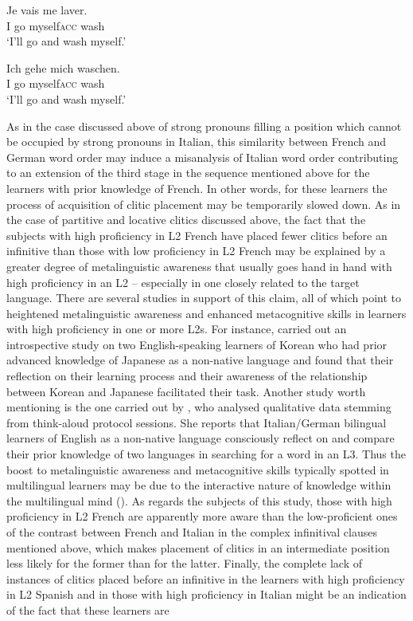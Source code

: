 \documentclass[output=paper,modfonts,nonflat,newtxmath]{langsci/langscibook}
\begin{document}
\ea \label{ex:sciutti:45}
\begin{xlist}
    \ex \label{ex:sciutti:45a}
    \gll Je vais me laver.\\
        I go myself\textsc{acc} wash\\
    \glt  ‘I’ll go and wash myself.’

    \ex \label{ex:sciutti:45b}
    \gll Ich gehe mich waschen.\\
        I go myself\textsc{acc} wash\\
    \glt ‘I’ll go and wash myself.’
\end{xlist}
\z

As in the case discussed above of strong pronouns filling a position which cannot be occupied by strong pronouns in Italian, this similarity between French and German word order may induce a misanalysis of Italian word order contributing to an extension of the third stage in the sequence mentioned above for the learners with prior knowledge of French. In other words, for these learners the process of acquisition of clitic placement may be temporarily slowed down. As in the case of partitive and locative clitics discussed above, the fact that the subjects with high proficiency in L2 French have placed fewer clitics before an infinitive than those with low proficiency in L2 French may be explained by a greater degree of metalinguistic awareness that usually goes hand in hand with high proficiency in an L2 – especially in one closely related to the target language. There are several studies in support of this claim, all of which point to heightened metalinguistic awareness and enhanced metacognitive skills in learners with high proficiency in one or more L2s. For instance, \citet{Fouser2001} carried out an introspective study on two English-speaking learners of Korean who had prior advanced knowledge of Japanese as a non-native language and found that their reflection on their learning process and their awareness of the relationship between Korean and Japanese facilitated their task. Another study worth mentioning is the one carried out by \citet{Jessner1999}, who analysed qualitative data stemming from think-aloud protocol sessions. She reports that Italian/German bilingual learners of English as a non-native language consciously reflect on and compare their prior knowledge of two languages in searching for a word in an L3. Thus the boost to metalinguistic awareness and metacognitive skills typically spotted in multilingual learners may be due to the interactive nature of knowledge within the multilingual mind (\citealt{HerdinaJessner2000, HerdinaJessner2002, Jessner2003, Jessner2008DST, Jessner2008Knowledge, Jessner2009}). As regards the subjects of this study, those with high proficiency in L2 French are apparently more aware than the low-proficient ones of the contrast between French and Italian in the complex infinitival clauses mentioned above, which makes placement of clitics in an intermediate position less likely for the former than for the latter. Finally, the complete lack of instances of clitics placed before an infinitive in the learners with high proficiency in L2 Spanish and in those with high proficiency in Italian might be an indication of the fact that these learners are 
\end{document}
